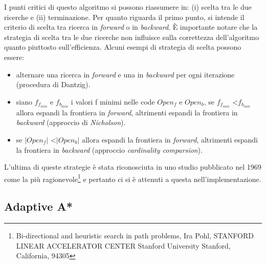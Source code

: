 \documentclass[11pt]{article}
\begin{document}
\par{
I punti critici di questo algoritmo si possono riassumere in: (i) scelta tra le due ricerche e (ii) terminazione.
Per quanto riguarda il primo punto, si intende il criterio di scelta tra ricerca in \emph{forward} o in \emph{backward}. \`E importante notare che la strategia di scelta tra le due ricerche non influisce sulla correttezza dell'algoritmo quanto piuttosto sull'efficienza. Alcuni esempi di strategia di scelta possono essere: \begin{itemize}
\item alternare una ricerca in \emph{forward} e una in \emph{backward} per ogni iterazione (procedura di Dantzig).
\item siano $f_{f_{min}}$ e $f_{b_{min}}$ i valori f minimi nelle code $Open_{f}$ e $Open_{b}$, se $f_{f_{min}}$ \textless $f_{b_{min}}$ allora espandi la frontiera in \emph{forward}, altrimenti espandi la frontiera in \emph{backward} (approccio di \emph{Nicholson}).
\item se $|Open_{f}|$ \textless $|Open_{b}|$ allora espandi la frontiera in \emph{forward}, altrimenti espandi la frontiera in \emph{backward} (approccio \emph{cardinality comparsion}).
\end{itemize}
}
\par{L'ultima di queste strategie \`e stata riconosciuta in uno studio pubblicato nel 1969 come la pi\`u ragionevole\footnote{Bi-directional and heuristic search in path problems, Ira Pohl, STANFORD LINEAR ACCELERATOR CENTER Stanford University Stanford, California, 94305} e pertanto ci si \`e attenuti a questa nell'implementazione.}


\subsection{Adaptive A*}
\end{document}
